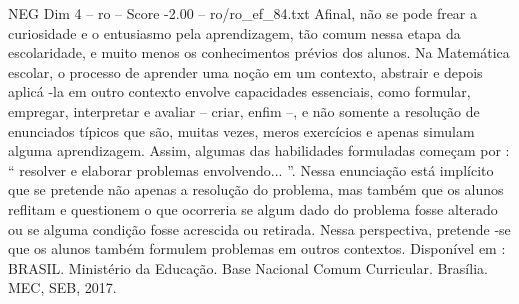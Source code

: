 \begin{textsample}{NEG Dim 4 – ro – Score -2.00 – ro/ro\_ef\_84.txt}
Afinal, não se pode frear a curiosidade e o entusiasmo pela aprendizagem, tão comum nessa etapa da escolaridade, e muito menos os conhecimentos prévios dos alunos.
Na Matemática escolar, o processo de aprender uma noção em um contexto, abstrair e depois aplicá -la em outro contexto envolve capacidades essenciais, como formular, empregar, interpretar e avaliar – criar, enfim –, e não somente a resolução de enunciados típicos que são, muitas vezes, meros exercícios e apenas simulam alguma aprendizagem.
Assim, algumas das habilidades formuladas começam por : “ resolver e elaborar problemas envolvendo... ”.
Nessa enunciação está implícito que se pretende não apenas a resolução do problema, mas também que os alunos reflitam e questionem o que ocorreria se algum dado do problema fosse alterado ou se alguma condição fosse acrescida ou retirada.
Nessa perspectiva, pretende -se que os alunos também formulem problemas em outros contextos.
Disponível em : BRASIL.
Ministério da Educação.
Base Nacional Comum Curricular.
Brasília.
MEC, SEB, 2017.

\end{textsample}
